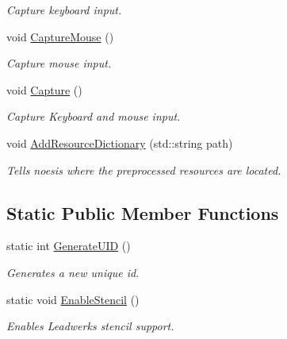 \begin{DoxyCompactItemize}
\begin{DoxyCompactList}\small\item\em Capture keyboard input. \end{DoxyCompactList}\item 
\hypertarget{class_u_i_system_a9139946c67db84d93b4a23a42a51eea1}{void \hyperlink{class_u_i_system_a9139946c67db84d93b4a23a42a51eea1}{Capture\-Mouse} ()}\label{class_u_i_system_a9139946c67db84d93b4a23a42a51eea1}

\begin{DoxyCompactList}\small\item\em Capture mouse input. \end{DoxyCompactList}\item 
\hypertarget{class_u_i_system_a29ac5727af1a979e24f4e8a92ff7a5a3}{void \hyperlink{class_u_i_system_a29ac5727af1a979e24f4e8a92ff7a5a3}{Capture} ()}\label{class_u_i_system_a29ac5727af1a979e24f4e8a92ff7a5a3}

\begin{DoxyCompactList}\small\item\em Capture Keyboard and mouse input. \end{DoxyCompactList}\item 
void \hyperlink{class_u_i_system_a1d776f5b5beb8c0577f9846cb5908c77}{Add\-Resource\-Dictionary} (std\-::string path)
\begin{DoxyCompactList}\small\item\em Tells noesis where the preprocessed resources are located. \end{DoxyCompactList}\end{DoxyCompactItemize}
\subsection*{Static Public Member Functions}
\begin{DoxyCompactItemize}
\item 
static int \hyperlink{class_u_i_system_a5735f001450f7ecd82a4de76558640c6}{Generate\-U\-I\-D} ()
\begin{DoxyCompactList}\small\item\em Generates a new unique id. \end{DoxyCompactList}\item 
static void \hyperlink{class_u_i_system_ac99ba6fff41b063161c3aaad85e6e1f4}{Enable\-Stencil} ()
\begin{DoxyCompactList}\small\item\em Enables Leadwerks stencil support. \end{DoxyCompactList}\end{DoxyCompactItemize}
